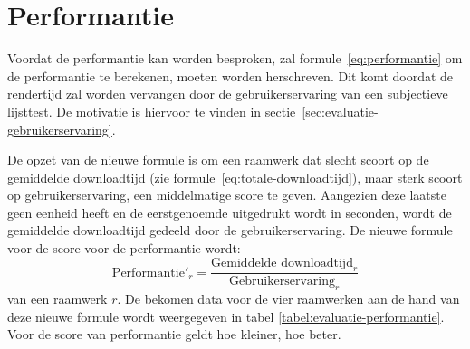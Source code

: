 \section{Performantie}
\label{sec:evaluatie-performantie}

Voordat de performantie kan worden besproken, zal formule~\ref{eq:performantie} om de performantie te berekenen, moeten worden herschreven.
Dit komt doordat de rendertijd zal worden vervangen door de gebruikerservaring van een subjectieve lijsttest.
De motivatie is hiervoor te vinden in sectie~\ref{sec:evaluatie-gebruikerservaring}. 

De opzet van de nieuwe formule is om een raamwerk dat slecht scoort op de gemiddelde downloadtijd (zie formule~\ref{eq:totale-downloadtijd}), maar sterk scoort op gebruikerservaring, een middelmatige score te geven.
Aangezien deze laatste geen eenheid heeft en de eerstgenoemde uitgedrukt wordt in seconden, wordt de gemiddelde downloadtijd gedeeld door de gebruikerservaring. De nieuwe formule voor de score voor de performantie wordt:
\begin{equation}
  \text{Performantie}'_r = \frac{\text{Gemiddelde downloadtijd}_r}{\text{Gebruikerservaring}_r}
  \label{eq:performantie-enhanced}
\end{equation}
van een raamwerk $r$. 
De bekomen data voor de vier raamwerken aan de hand van deze nieuwe formule wordt weergegeven in tabel \ref{tabel:evaluatie-performantie}.
Voor de score van performantie geldt hoe kleiner, hoe beter.
\begin{table}[H]
\centering
{}
\caption{Overzicht van performantie voor \st{}~(\sta), \kendo{}~(\kendoa), \jqm{}~(\jqma) en \lungo{}~(\lungoa). Minder is beter.}
\label{tabel:evaluatie-performantie}
\end{table}

